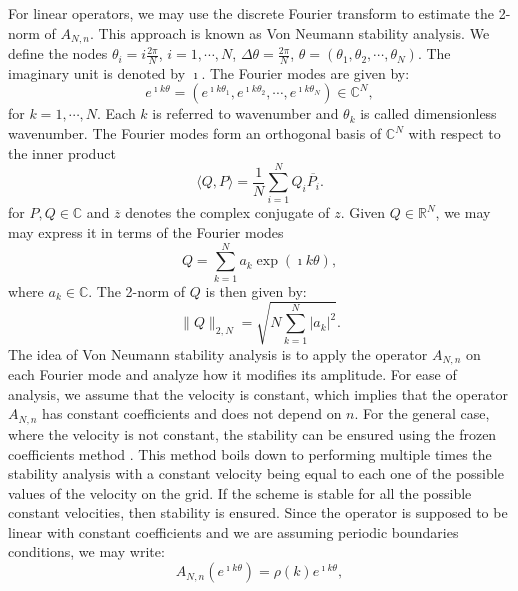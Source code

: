For linear operators, we may use the discrete Fourier transform \citep{trefethen:2000}
to estimate the 2-norm of $A_{N,n}$. This approach is known as Von Neumann stability analysis.
We define the nodes $\theta_i = i\frac{2\pi}{N}$, $i=1, \cdots, N$, $\Delta \theta = \frac{2\pi}{N}$,
$\theta = (\theta_1, \theta_2, \cdots, \theta_N)$.
The imaginary unit is denoted by $\imath$.
The Fourier modes are given by:
\begin{equation*}
	e^{\imath k \theta} = (e^{\imath k\theta_1}, e^{\imath k\theta_2}, \cdots, e^{\imath k\theta_N}) \in \mathbb{C}^N, 
\end{equation*}
for $k=1, \cdots, N$. 
Each $k$ is referred to wavenumber and $\theta_k$ is called  dimensionless wavenumber.
The Fourier modes form an orthogonal basis of $\mathbb{C}^N$ with respect to the 
inner product
\begin{equation*}
	\langle Q, P \rangle = \frac{1}{N}\sum_{i=1}^{N}{Q_i \overline{P_i}}.
\end{equation*}
for $P, Q \in \mathbb{C}$ and $\overline{z}$ denotes the complex conjugate of $z$. 
Given $Q \in \mathbb{R}^N$, we may may express it in terms of the Fourier modes
\begin{equation*}
	Q = \sum_{k=1}^{N} a_k \exp(\imath k \theta),
\end{equation*}
where $a_k \in \mathbb{C}$. The 2-norm of $Q$ is then given by:
\begin{equation*}
	\|Q\|_{2,N} = \sqrt{N \sum_{k=1}^{N} |a_k|^2}.
\end{equation*}
The idea of Von Neumann stability analysis is to apply the operator $A_{N,n}$ on each Fourier mode and
analyze how it modifies its amplitude.
For ease of analysis, we assume that the velocity is constant, which implies that
the operator $A_{N,n}$ has constant coefficients and does not depend on $n$.
For the general case, where the velocity is not constant, the stability
can be ensured using the frozen coefficients method \citep[p.~59]{strikwerda:2004}.
This method boils down to performing multiple times the stability analysis with a constant velocity
being equal to each one of the possible values of the velocity on the grid.
If the scheme is stable for all the possible constant velocities, then stability is ensured.
Since the operator is supposed to be linear with constant coefficients and we
are assuming periodic boundaries conditions, we may write:
\begin{equation*}
	A_{N,n}(e^{\imath k \theta}) = \rho(k)  e^{\imath k \theta},
\end{equation*}
